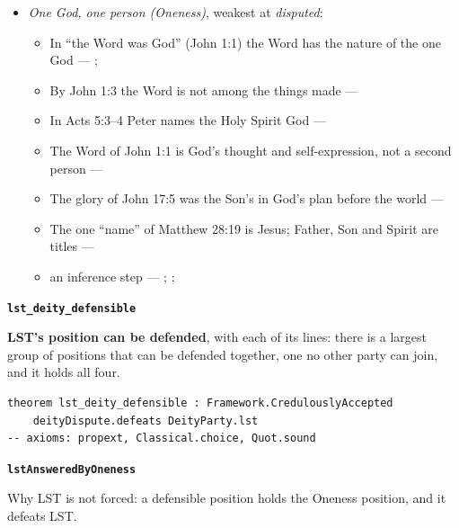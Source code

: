 \documentclass[11pt,paper=\testimonypaper,DIV=13,parskip=false]{scrartcl}
\begin{document}
\begin{itemize}
\begin{itemize}
\item an inference step --- \cite[23]{watchtower-should-you-believe-trinity-1989}; \cite[122--123]{roberts-christendom-astray}
\end{itemize}
\item \emph{One God, one person (Oneness)}, weakest at \emph{disputed}:
\begin{itemize}
\item In “the Word was God” (John 1:1) the Word has the nature of the one God --- \cite{harner-qualitative-anarthrous-1973}; \cite[3, The Triune God]{kibbey-living-systematic-theology-2026}
\item By John 1:3 the Word is not among the things made --- \cite[Tractates on John I.11]{schaff-nicene-post-nicene-fathers-1-7}
\item In Acts 5:3–4 Peter names the Holy Spirit God --- \cite[198]{calvin-commentary-acts-1844}
\item The Word of John 1:1 is God’s thought and self-expression, not a second person --- \cite[ch. 4 and 8, on John 1:1]{bernard-oneness-of-god-1983}
\item The glory of John 17:5 was the Son’s in God’s plan before the world --- \cite[ch. 8, The Preexistence of Jesus]{bernard-oneness-of-god-1983}
\item The one “name” of Matthew 28:19 is Jesus; Father, Son and Spirit are titles --- \cite[ch. 6, Matthew 28:19]{bernard-oneness-of-god-1983}
\item an inference step --- \cite[3, The Triune God]{kibbey-living-systematic-theology-2026}; \cite[ch. 4, Conclusion]{bernard-oneness-of-god-1983}; \cite[17--19]{buzzard-caveat-lector-2001}
\end{itemize}
\end{itemize}
\par\medskip\noindent\textbf{\texttt{lst\_\allowbreak{}deity\_\allowbreak{}defensible}}\par\nobreak\noindent
\textbf{LST’s position can be defended}, with each of its lines: there is a largest group of positions that can be defended together, one no other party can join, and it holds all four.

{\small\begin{verbatim}
theorem lst_deity_defensible : Framework.CredulouslyAccepted
    deityDispute.defeats DeityParty.lst
-- axioms: propext, Classical.choice, Quot.sound
\end{verbatim}}
\par\medskip\noindent\textbf{\texttt{lst\allowbreak{}Answered\allowbreak{}By\allowbreak{}Oneness}}\par\nobreak\noindent
Why LST is not forced: a defensible position holds the Oneness position, and it defeats LST.
\end{document}
